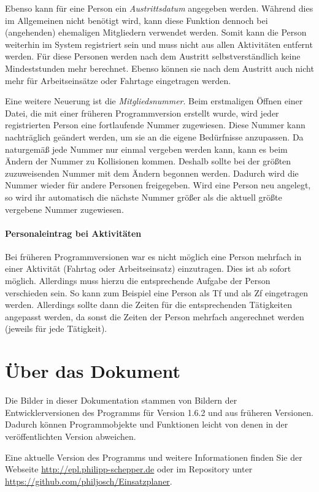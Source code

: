 Ebenso kann für eine Person ein \emph{Austrittsdatum} angegeben werden.
Während dies im Allgemeinen nicht benötigt wird, kann diese Funktion dennoch bei (angehenden) ehemaligen Mitgliedern verwendet werden.
Somit kann die Person weiterhin im System registriert sein und muss nicht aus allen Aktivitäten entfernt werden.
Für diese Personen werden nach dem Austritt selbstverständlich keine Mindeststunden mehr berechnet.
Ebenso können sie nach dem Austritt auch nicht mehr für Arbeitseinsätze oder Fahrtage eingetragen werden.

Eine weitere Neuerung ist die \emph{Mitgliedsnummer}.
Beim erstmaligen Öffnen einer Datei, die mit einer früheren Programmversion erstellt wurde, wird jeder registrierten Person eine fortlaufende Nummer zugewiesen.
Diese Nummer kann nachträglich geändert werden, um sie an die eigene Bedürfnisse anzupassen.
Da naturgemäß jede Nummer nur einmal vergeben werden kann,
kann es beim Ändern der Nummer zu Kollisionen kommen.
Deshalb sollte bei der größten zuzuweisenden Nummer mit dem Ändern begonnen werden.
Dadurch wird die Nummer wieder für andere Personen freigegeben.
Wird eine Person neu angelegt,
so wird ihr automatisch die nächste Nummer größer als die aktuell größte vergebene Nummer zugewiesen.


\paragraph{Personaleintrag bei Aktivitäten}
Bei früheren Programmversionen war es nicht möglich eine Person mehrfach in einer Aktivität (Fahrtag oder Arbeitseinsatz) einzutragen.
Dies ist ab sofort möglich.
Allerdings muss hierzu die entsprechende Aufgabe der Person verschieden sein.
So kann zum Beispiel eine Person als Tf und als Zf eingetragen werden.
Allerdings sollte dann die Zeiten für die entsprechenden Tätigkeiten angepasst werden,
da sonst die Zeiten der Person mehrfach angerechnet werden (jeweils für jede Tätigkeit).




\section{Über das Dokument}
Die Bilder in dieser Dokumentation stammen von Bildern der Entwicklerversionen des Programms für Version 1.6.2 und aus früheren Versionen.
Dadurch können Programmobjekte und Funktionen leicht von denen in der veröffentlichten Version abweichen.

Eine aktuelle Version des Programms und weitere Informationen finden Sie der Webseite \url{http://epl.philipp-schepper.de}
oder im Repository unter \url{https://github.com/philjosch/Einsatzplaner}.
